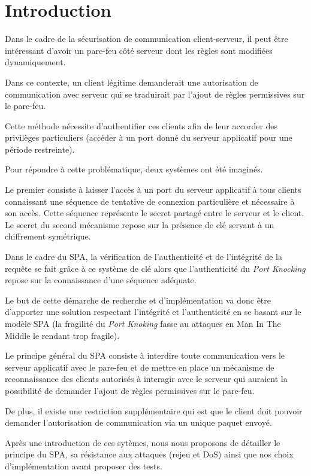 \chapter*{Introduction}

Dans le cadre de la sécurisation de communication client-serveur, il peut être intéressant d'avoir un pare-feu côté serveur dont les règles sont modifiées dynamiquement.

Dans ce contexte, un client légitime demanderait une autorisation de communication avec serveur qui se traduirait par l'ajout de règles permissives sur le pare-feu.

Cette méthode nécessite d'authentifier ces clients afin de leur accorder des privilèges particuliers (accéder à un port donné du serveur applicatif pour une période restreinte).

Pour répondre à cette problématique, deux systèmes ont été imaginés.

Le premier consiste à laisser l'accès à un port du serveur applicatif à tous clients connaissant une séquence de tentative de connexion particulière et nécessaire à son accès. Cette séquence représente le secret partagé entre le serveur et le client.
Le secret du second mécanisme repose sur la présence de clé servant à un chiffrement symétrique.

Dans le cadre du SPA, la vérification de l'authenticité et de l'intégrité  de la requête se fait grâce à ce système de clé alors que l'authenticité du \emph{Port Knocking} repose sur la connaissance d'une séquence adéquate. 

Le but de cette démarche de recherche et d'implémentation va donc être d'apporter une solution respectant l'intégrité et l'authenticité en se basant sur le modèle SPA (la fragilité du \emph{Port Knoking} fasse au attaques en Man In The Middle le rendant trop fragile). 

Le principe général du SPA consiste à interdire toute communication vers le serveur applicatif avec le pare-feu et de mettre en place un mécanisme de reconnaissance des clients autorisés à interagir avec le serveur qui auraient la possibilité de demander l'ajout de règles permissives sur le pare-feu.

De plus, il existe une restriction supplémentaire qui est que le client doit pouvoir demander l'autorisation de communication via un unique paquet envoyé.

Après une introduction de ces sytèmes, nous nous proposons de détailler le principe du SPA, sa résistance aux attaques (rejeu et DoS) ainsi que nos choix d'implémentation avant proposer des tests.